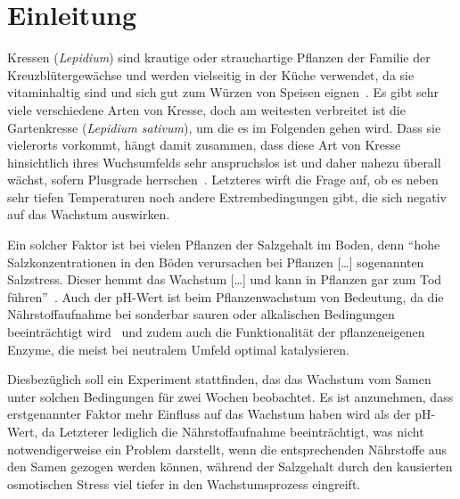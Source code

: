 \section{Einleitung} %
    \label{sec:einleitung}
    Kressen (\textit{Lepidium}) sind krautige oder strauchartige Pflanzen der Familie der Kreuzblütergewächse und werden vielseitig in der Küche verwendet, da sie vitaminhaltig sind und sich gut zum Würzen von Speisen eignen\ \cite[vgl.][]{web:meinschoenergarten}. Es gibt sehr viele verschiedene Arten von Kresse, doch am weitesten verbreitet ist die Gartenkresse (\textit{Lepidium sativum}), um die es im Folgenden gehen wird. Dass sie vielerorts vorkommt, hängt damit zusammen, dass diese Art von Kresse hinsichtlich ihres Wuchsumfelds sehr anspruchslos ist und daher nahezu überall wächst, sofern Plusgrade herrschen\ \cite[vgl.][]{web:meinschoenergarten}. Letzteres wirft die Frage auf, ob es neben sehr tiefen Temperaturen noch andere Extrembedingungen gibt, die sich negativ auf das Wachstum auswirken.\par
    Ein solcher Faktor ist bei vielen Pflanzen der Salzgehalt im Boden, denn ``hohe Salzkonzentrationen in den Böden verursachen bei Pflanzen [\dots] sogenannten Salzstress. Dieser hemmt das Wachstum [\dots] und kann in Pflanzen gar zum Tod führen''\ \cite{web:salzstress}. Auch der pH-Wert ist beim Pflanzenwachstum von Bedeutung, da die Nährstoffaufnahme bei sonderbar sauren oder alkalischen Bedingungen beeinträchtigt wird\ \cite[vgl.][]{web:phwert} und zudem auch die Funktionalität der pflanzeneigenen Enzyme, die meist bei neutralem Umfeld optimal katalysieren.\par
    Diesbezüglich soll ein Experiment stattfinden, das das Wachstum vom Samen unter solchen Bedingungen für zwei Wochen beobachtet. Es ist anzunehmen, dass erstgenannter Faktor mehr Einfluss auf das Wachstum haben wird als der pH-Wert, da Letzterer lediglich die Nährstoffaufnahme beeinträchtigt, was nicht notwendigerweise ein Problem darstellt, wenn die entsprechenden Nährstoffe aus den Samen gezogen werden können, während der Salzgehalt durch den kausierten osmotischen Stress viel tiefer in den Wachstumsprozess eingreift.
